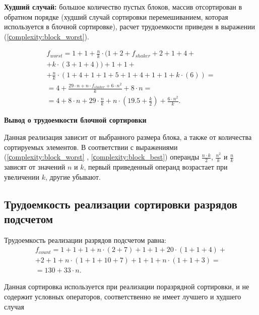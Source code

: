 \textbf{Худший случай:} большое количество пустых блоков, массив отсортирован в обратном порядке (худший случай сортировки перемешиванием, которая используется в блочной сортировке), расчет трудоемкости приведен в выражении (\ref{сomplexity:block_worst}).

\begin{equation}
	\label{сomplexity:block_worst}
	\begin{gathered}
		f_{worst} = 1 +1 + \frac{n}{k} \cdot(1 + 2+f_{shaker} + 2 + 1 + 4 + \\
		+ k \cdot (3 + 1 + 4)) + 1 + 1 + \\
		 + \frac{n}{k} \cdot (1 + 4 + 1 + 1 + 5 + 1 + 4 + 1 + 1 + k \cdot (6)) = \\
		= 4 + \frac{29\cdot n + n \cdot f_{shaker} + 6 \cdot n^2}{k}  + 8 \cdot n  = \\
		= 4 + 8 \cdot n + 29 \cdot \frac{n}{k} + n \cdot (19.5 + \frac{k}{2}) + \frac{6 \cdot n^2}{k}.
	\end{gathered}
\end{equation}


\textbf{Вывод о  трудоемкости блочной сортировки}

Данная реализация зависит от выбранного размера блока, а также от количества сортируемых элементов. В соответствии с выражениями (\ref{сomplexity:block_worst} , \ref{сomplexity:block_best})  операнды $\frac{n \cdot k}{2}$, $\frac{n^2}{k}$ и $\frac{n}{k}$ зависят от значений $n$ и $k$, первый приведенный операнд возрастает при увеличении $k$, другие убывают.

\subsection{Трудоемкость реализации сортировки разрядов подсчетом}

Трудоемкость реализации разрядов подсчетом равна:
\begin{equation}
	\label{сomplexity:count_best_worst}
	\begin{gathered}
		f_{count} = 1 + 1 + 1 + n \cdot (2 + 7)	 + 1 + 1 + 20 \cdot (1 + 1 + 4) + \\
		+ 2 + 1 + n \cdot (1 + 1 + 10 + 7) + 1 + 1 + n \cdot(1 +1 + 3) = \\
		= 130 + 33 \cdot n.
	\end{gathered}
\end{equation}

Данная сортировка используется при реализации поразрядной сортировки, и не содержит условных операторов, соответственно не имеет лучшего и худшего случая





